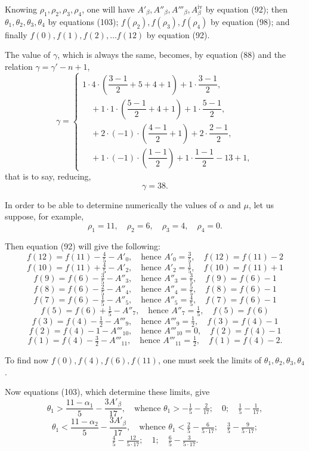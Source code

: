 \documentclass{article}
\begin{document}
Knowing $\rho_1, \rho_2, \rho_3, \rho_4$, one will have $A'_\beta, A''_\beta, A'''_\beta, A^{\text{iv}}_\beta$ by equation (92); then $\theta_1, \theta_2, \theta_3, \theta_4$ by equations (103); $f(\rho_2), f(\rho_3), f(\rho_4)$ by equation (98); and finally $f(0), f(1), f(2), \ldots f(12)$ by equation (92).

The value of $\gamma$, which is always the same, becomes, by equation (88) and the relation $\gamma = \gamma'-n+1$,
\[ \gamma = \begin{cases}
1 \cdot 4 \cdot \left(\dfrac{3-1}{2}+5+4+1\right) + 1 \cdot \dfrac{3-1}{2}, \\
\quad + 1 \cdot 1 \cdot \left(\dfrac{5-1}{2}+4+1\right) + 1 \cdot \dfrac{5-1}{2}, \\
\quad + 2 \cdot (-1) \cdot \left(\dfrac{4-1}{2}+1\right) + 2 \cdot \dfrac{2-1}{2}, \\
\quad + 1 \cdot (-1) \cdot \left(\dfrac{1-1}{2}\right) + 1 \cdot \dfrac{1-1}{2} - 13 + 1,
\end{cases} \]
that is to say, reducing,
\[ \gamma = 38. \]

In order to be able to determine numerically the values of $\alpha$ and $\mu$, let us suppose, for example,
\[ \rho_1 = 11, \quad \rho_2 = 6, \quad \rho_3 = 4, \quad \rho_4 = 0. \]

Then equation (92) will give the following:
\[ f(12) = f(11) - \tfrac{4}{5} - A'_0, \quad \text{hence } A'_0 = \tfrac{3}{5}, \quad f(12) = f(11) - 2 \]
\[ f(10) = f(11) + \tfrac{4}{5} - A'_2, \quad \text{hence } A'_2 = \tfrac{1}{5}, \quad f(10) = f(11) + 1 \]
\[ f(9) = f(6) - \tfrac{3}{5} - A''_3, \quad \text{hence } A''_3 = \tfrac{3}{5}, \quad f(9) = f(6) - 1 \]
\[ f(8) = f(6) - \tfrac{2}{5} - A''_4, \quad \text{hence } A''_4 = \tfrac{5}{5}, \quad f(8) = f(6) - 1 \]
\[ f(7) = f(6) - \tfrac{1}{5} - A''_5, \quad \text{hence } A''_5 = \tfrac{4}{5}, \quad f(7) = f(6) - 1 \]
\[ f(5) = f(6) + \tfrac{1}{5} - A''_7, \quad \text{hence } A''_7 = \tfrac{1}{5}, \quad f(5) = f(6) \]
\[ f(3) = f(4) - \tfrac{1}{2} - A'''_9, \quad \text{hence } A'''_9 = \tfrac{1}{2}, \quad f(3) = f(4) - 1 \]
\[ f(2) = f(4) - 1 - A'''_{10}, \quad \text{hence } A'''_{10} = 0, \quad f(2) = f(4) - 1 \]
\[ f(1) = f(4) - \tfrac{3}{2} - A'''_{11}, \quad \text{hence } A'''_{11} = \tfrac{1}{2}, \quad f(1) = f(4) - 2. \]

To find now $f(0), f(4), f(6), f(11)$, one must seek the limits of $\theta_1, \theta_2, \theta_3, \theta_4$.

Now equations (103), which determine these limits, give
\[ \theta_1 > \frac{11-\alpha_1}{5} - \frac{3A'_\beta}{17}, \quad \text{whence } \theta_1 > -\tfrac{1}{5} - \tfrac{2}{17}; \quad 0; \quad \tfrac{1}{5} - \tfrac{1}{17}, \]
\[ \theta_1 < \frac{11-\alpha_2}{5} - \frac{3A'_\beta}{17}, \quad \text{whence } \theta_1 < \tfrac{2}{5} - \tfrac{6}{5 \cdot 17}; \quad \tfrac{3}{5} - \tfrac{9}{5 \cdot 17}; \]
\[ \tfrac{4}{5} - \tfrac{12}{5 \cdot 17}; \quad 1; \quad \tfrac{6}{5} - \tfrac{3}{5 \cdot 17}. \]
\end{document}
